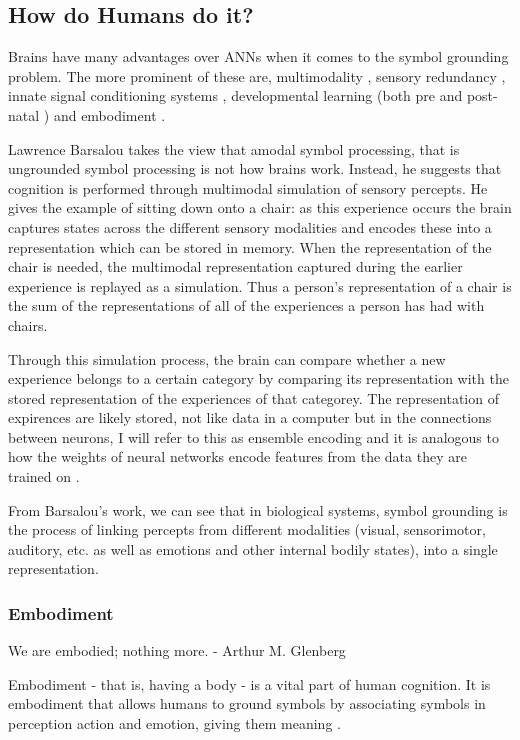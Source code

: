 \subsection{How do Humans do it?}
Brains have many advantages over \acp{ANN} when it comes to the symbol grounding problem. The more prominent of these are, multimodality \cite{barsalou2008grounded}, sensory redundancy \cite{slater1999intermodal}, innate signal conditioning systems \cite{masland2012neuronal, fantz1963pattern, johnson2015two}, developmental learning (both pre \cite{webb2015mother, reid2017human} and post-natal \cite{johnson2015two}) and embodiment \cite{pfeifer2006body, smith2005development}.

Lawrence Barsalou \cite{barsalou2008grounded} takes the view that amodal symbol processing, that is ungrounded symbol processing is not how brains work. Instead, he suggests that cognition is performed through multimodal simulation of sensory percepts. He gives the example of sitting down onto a chair: as this experience occurs the brain captures states across the different sensory modalities and encodes these into a representation which can be stored in memory. When the representation of the chair is needed, the multimodal representation captured during the earlier experience is replayed as a simulation. Thus a person's representation of a chair is the sum of the representations of all of the experiences a person has had with chairs. 

Through this simulation process, the brain can compare whether a new experience belongs to a certain category by comparing its representation with the stored representation of the experiences of that categorey. The representation of expirences are likely stored, not like data in a computer but in the connections between neurons, I will refer to this as ensemble encoding \cite{nicolelis1995sensorimotor} and it is analogous to how the weights of neural networks encode features from the data they are trained on \cite{mordvintsev2015inceptionism}.


From Barsalou's work, we can see that in biological systems, symbol grounding is the process of linking percepts from different modalities (visual, sensorimotor, auditory, etc. as well as emotions and other internal bodily states), into a single representation. 

\subsubsection{Embodiment}
\begin{displayquote}
We are embodied; nothing more. - Arthur M. Glenberg
\end{displayquote}
Embodiment - that is, having a body - is a vital part of human cognition. It is embodiment that allows humans to ground symbols by associating symbols in perception action and emotion, giving them meaning \cite{glenberg2015few}.

